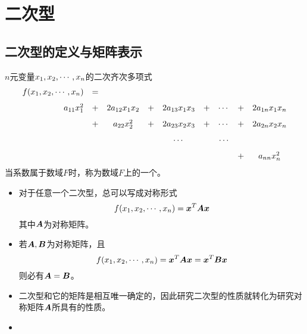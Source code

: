 \section{二次型}

\subsection{二次型的定义与矩阵表示}

\begin{frame}
  
  \begin{dingyi}[二次型]
    $n$元变量$x_1,x_2,\cdots,x_n$的二次齐次多项式
    \begin{equation}\label{qf}
    \begin{array}{rcccccccc}
      f(x_1,x_2,\cdots,x_n) &=& \\[0.1in]
      a_{11}x_1^2&+&2a_{12}x_1x_2&+&2a_{13}x_1x_3&+&\cdots&+&2a_{1n}x_1x_n\\[0.1in]
                         &+&a_{22}x_2^2&+&2a_{23}x_2x_3&+&\cdots&+&2a_{2n}x_2x_n\\[0.1in]
                         &&&&\cdots&&\cdots\\[0.1in]
                         &&&&&&&+&a_{nn}x_n^2
    \end{array}
    \end{equation}
    当系数属于数域$F$时，称为数域$F$上的一个。
  \end{dingyi}
  
\end{frame}

\begin{frame}
  
  \begin{itemize}
  \item
    对于任意一个二次型，总可以写成对称形式
    $$
    f(x_1,x_2,\cdots,x_n)={\boldsymbol{x}}^T\boldsymbol{A}{\boldsymbol{x}}
    $$
    其中$\boldsymbol{A}$为对称矩阵。\\[0.1in]\pause
  \item
    若$\boldsymbol{A},\boldsymbol{B}$为对称矩阵，且
    $$
    f(x_1,x_2,\cdots,x_n)={\boldsymbol{x}}^T\boldsymbol{A}{\boldsymbol{x}}={\boldsymbol{x}}^T\boldsymbol{B}{\boldsymbol{x}}
    $$
    则必有$\boldsymbol{A}=\boldsymbol{B}$。\\[0.1in]\pause
  \item 二次型和它的矩阵是相互唯一确定的，因此研究二次型的性质就转化为研究对称矩阵$\boldsymbol{A}$所具有的性质。\\[0.1in]\pause
  \item {}
  \end{itemize}

  
\end{frame}


